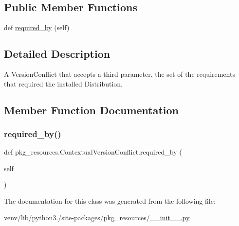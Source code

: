 \subsection*{Public Member Functions}
\begin{DoxyCompactItemize}
\item 
def \hyperlink{classpkg__resources_1_1ContextualVersionConflict_a429c1a4ab6cb79d7fedc5e9200b15b53}{required\+\_\+by} (self)
\end{DoxyCompactItemize}


\subsection{Detailed Description}
\begin{DoxyVerb}A VersionConflict that accepts a third parameter, the set of the
requirements that required the installed Distribution.
\end{DoxyVerb}
 

\subsection{Member Function Documentation}
\mbox{\label{classpkg__resources_1_1ContextualVersionConflict_a429c1a4ab6cb79d7fedc5e9200b15b53}} 
\subsubsection{\texorpdfstring{required\+\_\+by()}{required\_by()}}
{\footnotesize\ttfamily def pkg\+\_\+resources.\+Contextual\+Version\+Conflict.\+required\+\_\+by (\begin{DoxyParamCaption}\item[{}]{self }\end{DoxyParamCaption})}



The documentation for this class was generated from the following file\+:\begin{DoxyCompactItemize}
\item 
venv/lib/python3./site-\/packages/pkg\+\_\+resources/\hyperlink{venv_2lib_2python3_89_2site-packages_2pkg__resources_2____init_____8py}{\+\_\+\+\_\+init\+\_\+\+\_\+.\+py}\end{DoxyCompactItemize}
